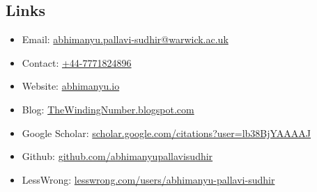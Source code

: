 \documentclass{article}
\begin{document}
\subsection*{Links}

\begin{itemize}
    \item Email: \href{mailto:abhimanyu.pallavi-sudhir@warwick.ac.uk}{abhimanyu.pallavi-sudhir@warwick.ac.uk}
    \item Contact: \href{tel:+44-7771824896}{+44-7771824896}
    \item Website: \href{https://abhimanyu.io/}{abhimanyu.io}
    \item Blog: \href{https://thewindingnumber.blogspot.com/}{TheWindingNumber.blogspot.com}
    \item Google Scholar: \href{https://scholar.google.com/citations?user=lb38BjYAAAAJ&hl=en}{scholar.google.com/citations?user=lb38BjYAAAAJ}
    \item Github: \href{https://github.com/abhimanyupallavisudhir}{github.com/abhimanyupallavisudhir}
    \item LessWrong: \href{https://www.lesswrong.com/users/abhimanyu-pallavi-sudhir}{lesswrong.com/users/abhimanyu-pallavi-sudhir}
\end{itemize}
\end{document}
